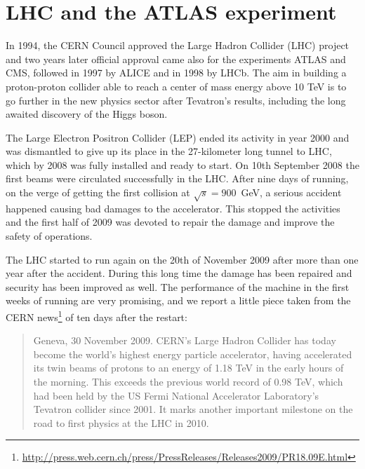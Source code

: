 

\clearpage{\pagestyle{empty}\cleardoublepage}


\chapter{LHC and the ATLAS experiment}\label{chap:atlas}

In 1994, the CERN Council approved the Large Hadron Collider (LHC) project and two years later official approval came also for the experiments ATLAS and CMS, followed in 1997 by ALICE and in 1998 by LHCb. The aim in building a proton-proton collider able to reach a center of mass energy above 10 TeV is to go further in the new physics sector after Tevatron's results, including the long awaited discovery of the Higgs boson.

The Large Electron Positron Collider (LEP) ended its activity in year 2000 and was dismantled to give up its place in the 27-kilometer long tunnel to LHC, which by 2008 was fully installed and ready to start. On 10th September 2008 the first beams were circulated successfully in the LHC. After nine days of running, on the verge of getting the first collision at $\sqrt{s} = 900$~GeV, a serious accident happened causing bad damages to the accelerator. This stopped the activities and the first half of 2009 was devoted to repair the damage and improve the safety of operations.

The LHC started to run again on the 20th of November 2009 after more than one year after the accident. During this long time the damage has been repaired and security has been improved as well. The performance of the machine in the first weeks of running are very promising, and we report a little piece taken from the CERN news\footnote{\url{http://press.web.cern.ch/press/PressReleases/Releases2009/PR18.09E.html}} of ten days after the restart:
\begin{quotation}\small
Geneva, 30 November 2009. CERN's Large Hadron Collider has today become the world’s highest energy particle accelerator, having accelerated its twin beams of protons to an energy of 1.18 TeV in the early hours of the morning. This exceeds the previous world record of 0.98 TeV, which had been held by the US Fermi National Accelerator Laboratory’s Tevatron collider since 2001. It marks another important milestone on the road to first physics at the LHC in 2010.
\end{quotation}


